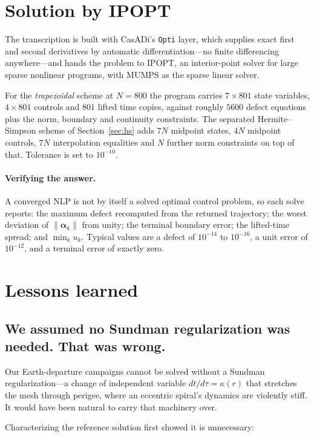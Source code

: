 \documentclass[11pt]{article}
\newcommand{\bal}{\boldsymbol{\alpha}}
\newcommand{\code}[1]{\texttt{#1}}
\begin{document}
\section{Solution by IPOPT}

The transcription is built with CasADi's \code{Opti} layer, which supplies exact
first and second derivatives by automatic differentiation---no finite
differencing anywhere---and hands the problem to IPOPT, an interior-point solver
for large sparse nonlinear programs, with MUMPS as the sparse linear solver.

For the \emph{trapezoidal} scheme at $N = 800$ the program carries
$7 \times 801$ state variables, $4 \times 801$ controls and $801$ lifted time
copies, against roughly $5600$ defect equations plus the norm, boundary and
continuity constraints. The separated Hermite--Simpson scheme of
Section~\ref{sec:hs} adds $7N$ midpoint states, $4N$ midpoint controls, $7N$
interpolation equalities and $N$ further norm constraints on top of that.
Tolerance is set to $10^{-10}$.

\paragraph{Verifying the answer.} A converged NLP is not by itself a solved
optimal control problem, so each solve reports: the maximum defect recomputed
from the returned trajectory; the worst deviation of $\lVert\bal_k\rVert$ from
unity; the terminal boundary error; the lifted-time spread; and
$\min_k u_k$. Typical values are a defect of $10^{-14}$ to $10^{-16}$, a unit
error of $10^{-12}$, and a terminal error of exactly zero.

\section{Lessons learned}

\subsection{We assumed no Sundman regularization was needed. That was wrong.}

Our Earth-departure campaigns cannot be solved without a Sundman
regularization---a change of independent variable $dt/d\tau = \kappa(r)$ that
stretches the mesh through perigee, where an eccentric spiral's dynamics are
violently stiff. It would have been natural to carry that machinery over.

Characterizing the reference solution first showed it is unnecessary:
\end{document}
